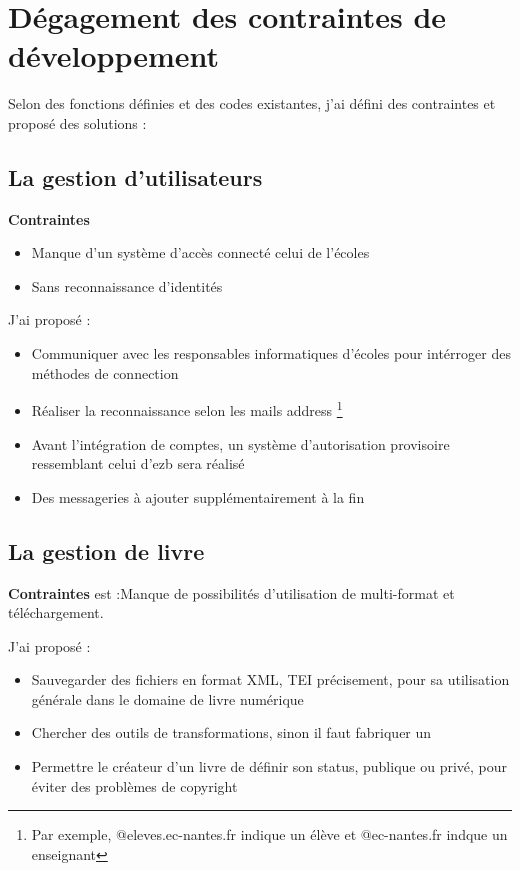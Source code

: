 \section{Dégagement des contraintes de développement}

Selon des fonctions définies et des codes existantes, j'ai défini des contraintes et proposé des solutions :


\subsection{La gestion d'utilisateurs}

\textbf{Contraintes} 

\begin{itemize}
    \item Manque d'un système d'accès connecté celui de l’écoles
    \item Sans reconnaissance d’identités
\end{itemize}

J'ai proposé :

\begin{itemize}
    \item Communiquer avec les responsables informatiques d'écoles pour intérroger des méthodes de connection
    \item Réaliser la reconnaissance selon les mails address \footnote{ Par exemple, @eleves.ec-nantes.fr indique un élève et @ec-nantes.fr indque un enseignant } 
    \item Avant l'intégration de comptes, un système d'autorisation provisoire ressemblant celui d'ezb sera réalisé
    \item Des messageries à ajouter supplémentairement à la fin
\end{itemize}


\subsection{La gestion de livre}

\textbf{Contraintes} est :Manque de possibilités d'utilisation de multi-format et téléchargement.

J'ai proposé :

\begin{itemize}
    \item Sauvegarder des fichiers en format XML, TEI précisement, pour sa utilisation générale dans le domaine de livre numérique
    \item Chercher des outils de transformations, sinon il faut fabriquer un 
    \item Permettre le créateur d'un livre de définir son status, publique ou privé, pour éviter des problèmes de copyright
\end{itemize}


